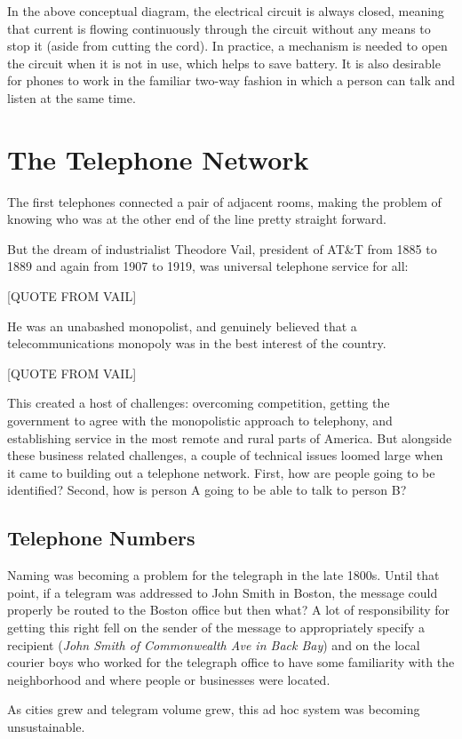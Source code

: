 \documentclass[UTF8]{book}
\begin{document}
\begin{CJK}{UTF8}{gbsn}
In the above conceptual diagram, the electrical circuit is always closed, meaning that current is flowing continuously through the circuit without any means to stop it (aside from cutting the cord). In practice, a mechanism is needed to open the circuit when it is not in use, which helps to save battery. It is also desirable for phones to work in the familiar two-way fashion in which a person can talk and listen at the same time.


\chapter{The Telephone Network}

The first telephones connected a pair of adjacent rooms, making the problem of knowing who was at the other end of the line pretty straight forward.

But the dream of industrialist Theodore Vail, president of AT\&T from 1885 to 1889 and again from 1907 to 1919, was universal telephone service for all:

[QUOTE FROM VAIL]

He was an unabashed monopolist, and genuinely believed that a telecommunications monopoly was in the best interest of the country.

[QUOTE FROM VAIL]

This created a host of challenges: overcoming competition, getting the government to agree with the monopolistic approach to telephony, and establishing service in the most remote and rural parts of America. But alongside these business related challenges, a couple of technical issues loomed large when it came to building out a telephone network. First, how are people going to be identified? Second, how is person A going to be able to talk to person B?

\section{Telephone Numbers}

Naming was becoming a problem for the telegraph in the late 1800s. Until that point, if a telegram was addressed to John Smith in Boston, the message could properly be routed to the Boston office but then what? A lot of responsibility for getting this right fell on the sender of the message to appropriately specify a recipient (\emph{John Smith of Commonwealth Ave in Back Bay}) and on the local courier boys who worked for the telegraph office to have some familiarity with the neighborhood and where people or businesses were located.

As cities grew and telegram volume grew, this ad hoc system was becoming unsustainable.



\end{CJK}
\end{document}

